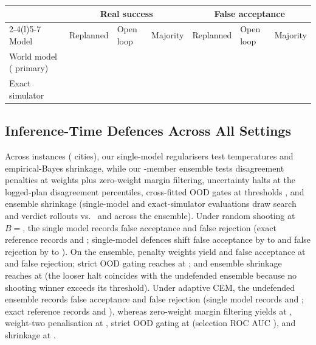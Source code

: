 \begin{table}[tbp]
\vspace{6pt}
\begin{tabular*}{\textwidth}{@{\extracolsep{\fill}}lllllll@{}}
\toprule
& \multicolumn{3}{c}{Real success} & \multicolumn{3}{c}{False acceptance} \\
\cmidrule(lr){2-4}\cmidrule(l){5-7}
Model & Replanned & Open loop & Majority & Replanned & Open loop & Majority \\
\midrule
World model (\SizeM{} primary) & \RpEmuReplanOrAcc{} & \RpEmuOpenOrAcc{} & \RpEmuOpenOrcOrAcc{} & \RpEmuReplanHack{} & \RpEmuOpenHack{} & \RpEmuOpenOrcHack{} \\
Exact simulator & \RpPerfReplanOrAcc{} & \RpPerfOpenOrAcc{} & \RpPerfOpenOrcOrAcc{} & \RpPerfReplanHack{} & \RpPerfOpenHack{} & \RpPerfOpenOrcHack{} \\
\bottomrule
\end{tabular*}
\end{table}
\fi

\subsection{Inference-Time Defences Across All Settings}\label{app:defences}

Across \DefInstances{} instances (\DefFamilies{} cities), our single-model regularisers test temperatures \DefTemps{} and empirical-Bayes shrinkage, while our \DefMembers-member ensemble tests disagreement penalties at weights \DefLambdas{} plus zero-weight margin filtering, uncertainty halts at the \DefHalts{} logged-plan disagreement percentiles, cross-fitted OOD gates at thresholds \DefDetThresh{}, and ensemble shrinkage (single-model and exact-simulator evaluations draw \DefKSearch{} search and \DefKVerdict{} verdict rollouts vs.\ \DefKSearchEns{} and \DefKVerdictEns{} across the ensemble). Under random shooting at $B ={}$, the single model records \DefMemberHack{} false acceptance and \DefMemberFalseRej{} false rejection (exact reference records \DefPerfHack{} and \DefPerfFalseRej{}; single-model defences shift false acceptance by \DefMemDiffMin{} to \DefMemDiffMax{} and false rejection by \DefMemFrMin{} to \DefMemFrMax{}). On the ensemble, penalty weights \DefLambdas{} yield \DefPenOneHack{} and \DefPenTwoHack{} false acceptance at \DefPenOneFalseRej{} and \DefPenTwoFalseRej{} false rejection; strict OOD gating reaches \DefDetLowHack{} at \DefDetLowFalseRej{}; and ensemble shrinkage reaches \DefDeflHack{} at \DefDeflFalseRej{} (the looser halt coincides with the undefended ensemble because no shooting winner exceeds its threshold). Under adaptive CEM, the undefended ensemble records \DefAdEnsHack{} \ci{\DefAdEnsHackCI} false acceptance and \DefAdEnsFalseRej{} false rejection (single model records \DefAdMemberHack{} and \DefAdMemberFalseRej{}; exact reference records \DefAdPerfHack{} and \DefAdPerfFalseRej{}), whereas zero-weight margin filtering yields \DefAdPenZeroHack{} at \DefAdPenZeroFalseRej{}, weight-two penalisation \DefAdPenTwoHack{} at \DefAdPenTwoFalseRej{}, strict OOD gating \DefAdDetLowHack{} at \DefAdDetLowFalseRej{} (selection ROC AUC \DetSelAucAd{} \ci{\DetSelAucAdCI}), and shrinkage \DefAdDeflHack{} at \DefAdDeflFalseRej{}.

